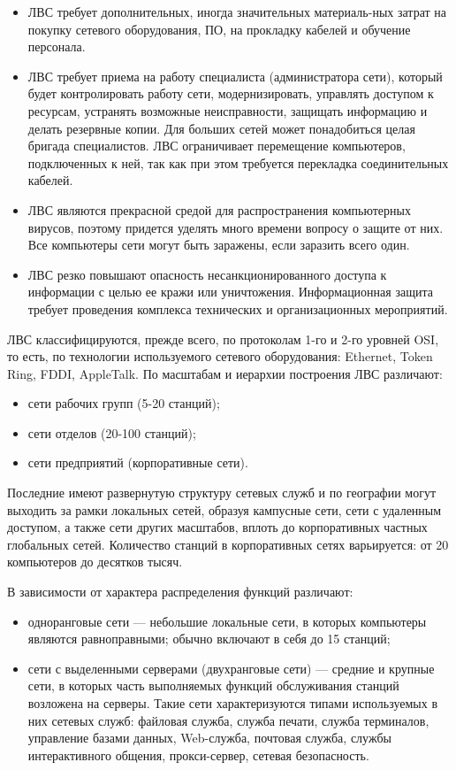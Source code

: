 \begin{itemize}
    \item ЛВС требует дополнительных, иногда значительных материаль-ных затрат на
        покупку сетевого оборудования, ПО, на прокладку кабелей и обучение персонала. 
    \item ЛВС требует приема на работу специалиста (администратора сети),  который
        будет контролировать  работу сети, модернизировать, управлять доступом к
        ресурсам, устранять возможные неисправности, защищать информацию и делать
        резервные копии. Для больших сетей может понадобиться целая бригада
        специалистов. ЛВС ограничивает перемещение компьютеров, подключенных к ней, так
        как при этом требуется перекладка соединительных кабелей.
    \item ЛВС являются прекрасной средой для распространения компьютерных  вирусов,
        поэтому придется уделять  много  времени  вопросу о защите от них. Все
        компьютеры сети могут быть заражены, если заразить всего один.
    \item ЛВС резко повышают опасность несанкционированного доступа к информации с целью
        ее кражи или уничтожения. Информационная защита требует проведения комплекса
        технических и организационных мероприятий.
\end{itemize}

ЛВС классифицируются,  прежде  всего, по протоколам  1-го  и  2-го уровней OSI, то есть,
по технологии используемого сетевого оборудования: Ethernet, Token Ring, FDDI,
AppleTalk. По масштабам и иерархии построения ЛВС различают: 
\begin{itemize}
    \item сети рабочих групп (5-20 станций); 
    \item сети отделов (20-100 станций); 
    \item сети предприятий (корпоративные сети).
\end{itemize}

    
Последние имеют  развернутую структуру  сетевых  служб  и  по  географии могут выходить
за рамки локальных сетей, образуя кампусные сети, сети с удаленным доступом, а также
сети других масштабов, вплоть до корпоративных частных глобальных сетей. Количество
станций в корпоративных сетях варьируется: от 20 компьютеров до десятков тысяч.

В зависимости от характера распределения функций различают: 

\begin{itemize}
    \item одноранговые  сети — небольшие  локальные  сети,  в которых компьютеры являются
        равноправными; обычно включают в себя до 15 станций;

    \item сети с выделенными серверами (двухранговые сети) — средние и крупные сети, в
        которых часть выполняемых функций обслуживания станций возложена на серверы. Такие
        сети характеризуются типами  используемых в них сетевых служб: файловая служба,
        служба печати, служба терминалов, управление базами данных, Web-служба, почтовая
        служба, службы интерактивного общения, прокси-сервер, сетевая безопасность.
\end{itemize}

